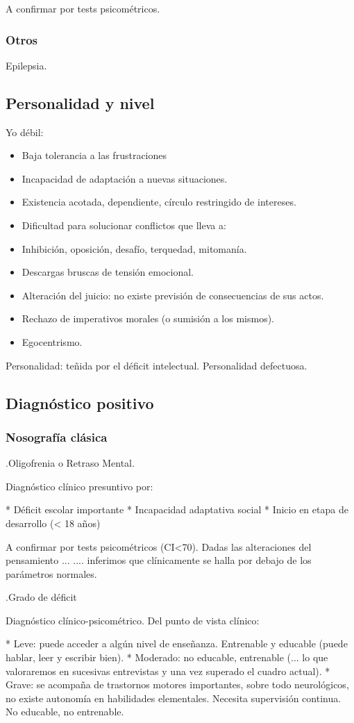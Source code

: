 A confirmar por tests psicométricos.
\subsubsection*{Otros}
Epilepsia.
\subsection*{Personalidad y nivel}
Yo débil:
\begin{itemize}
\item Baja tolerancia a las frustraciones
\item Incapacidad de adaptación a nuevas situaciones.
\item Existencia acotada, dependiente, círculo restringido de intereses.
\item Dificultad para solucionar conflictos que lleva a:
\item Inhibición, oposición, desafío, terquedad, mitomanía.
\item Descargas bruscas de tensión emocional.
\item Alteración del juicio: no existe previsión de consecuencias de sus actos.
\item Rechazo de imperativos morales (o sumisión a los mismos).
\item Egocentrismo.
\end{itemize}
Personalidad: teñida por el déficit intelectual. Personalidad defectuosa.
\subsection*{Diagnóstico positivo}
\subsubsection*{Nosografía clásica}
.Oligofrenia o Retraso Mental.

Diagnóstico clínico presuntivo por:

* Déficit escolar importante
* Incapacidad adaptativa social
* Inicio en etapa de desarrollo (< 18 años)

A confirmar por tests psicométricos (CI<70). Dadas las alteraciones del pensamiento ... .... inferimos que clínicamente se halla por debajo de los parámetros normales.

.Grado de déficit

Diagnóstico clínico-psicométrico. Del punto de vista clínico:

* Leve: puede acceder a algún nivel de enseñanza. Entrenable y educable (puede hablar, leer y escribir bien).
* Moderado: no educable, entrenable (... lo que valoraremos en sucesivas entrevistas y una vez superado el cuadro actual).
* Grave: se acompaña de trastornos motores importantes, sobre todo neurológicos, no existe autonomía en habilidades elementales. Necesita supervisión continua. No educable, no entrenable.

